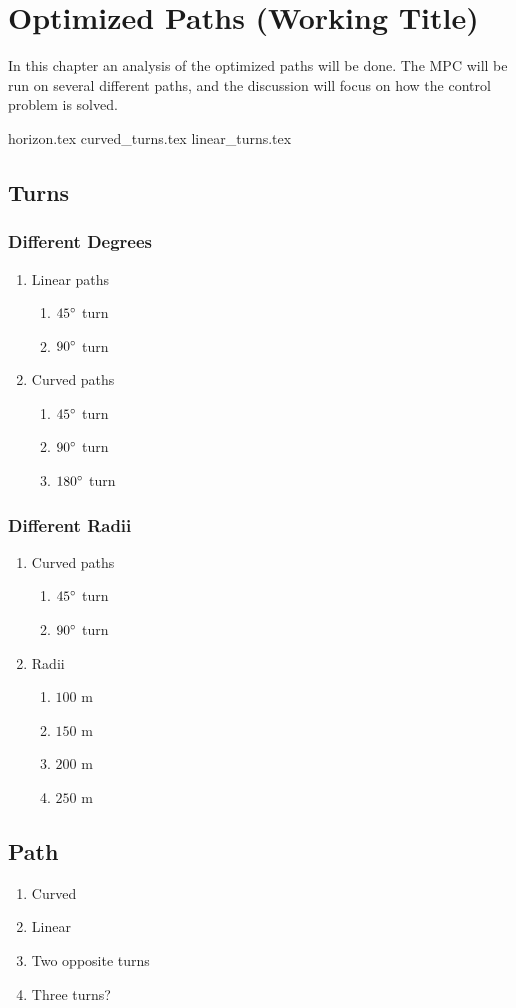 \chapter{Optimized Paths (Working Title)}


In this chapter an analysis of the optimized paths will be done. The MPC will be run on several different paths, and the discussion will focus on how the control problem is solved.

{horizon.tex}
{curved_turns.tex}
{linear_turns.tex}

\section{Turns}

\subsection{Different Degrees}

\begin{enumerate}
	\item Linear paths
	\begin{enumerate}
		\item $45 \degree$ turn
		\item $90 \degree$ turn
	\end{enumerate}
	\item Curved paths
	\begin{enumerate}
		\item $45 \degree$ turn
		\item $90 \degree$ turn
		\item $180 \degree$ turn
	\end{enumerate}
\end{enumerate}

\subsection{Different Radii}

\begin{enumerate}
	\item Curved paths
	\begin{enumerate}
		\item $45 \degree$ turn
		\item $90 \degree$ turn
	\end{enumerate}
	\item Radii
	\begin{enumerate}
		\item $100$ m
		\item $150$ m
		\item $200$ m
		\item $250$ m
	\end{enumerate}
\end{enumerate}



\section{Path}

\begin{enumerate}
	\item Curved
	\item Linear
	\item Two opposite turns
	\item Three turns?
\end{enumerate}


